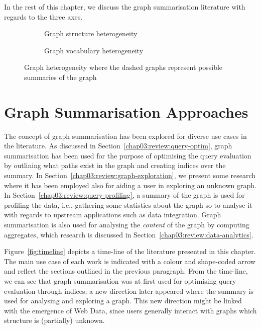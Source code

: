 In the rest of this chapter, we discuss the graph summarisation literature with regards to the three axes.

\begin{figure}
	\centering
	\begin{subfigure}{.5\textwidth}
		\resizebox{\textwidth}{!}{
			
		}
		\caption{Graph structure heterogeneity}
		\label{fig:hetero-struct}
	\end{subfigure}
	\qquad
	\begin{subfigure}{.42\textwidth}
		\resizebox{\textwidth}{!}{
			
		}
		\caption{Graph vocabulary heterogeneity}
		\label{fig:hetero-voc}
	\end{subfigure}
	\caption{Graph heterogeneity where the dashed graphs represent possible summaries of the graph}
	\label{fig:graph-hetero}
\end{figure}

\section{Graph Summarisation Approaches}

The concept of graph summarisation has been explored for diverse use cases in the literature. As discussed in Section~\ref{chap03:review:query-optim}, graph summarisation has been used for the purpose of optimising the query evaluation by outlining what paths exist in the graph and creating indices over the summary. In Section~\ref{chap03:review:graph-exploration}, we present some research where it has been employed also for aiding a user in exploring an unknown graph. In Section~\ref{chap03:review:query-profiling}, a summary of the graph is used for profiling the data, i.e., gathering some statistics about the graph so to analyse it with regards to upstream applications such as data integration. Graph summarisation is also used for analysing the \emph{content} of the graph by computing aggregates, which research is discussed in Section~\ref{chap03:review:data-analytics}.

Figure~\ref{fig:timeline} depicts a time-line of the literature presented in this chapter. The main use case of each work is indicated with a colour and shape-coded arrow and reflect the sections outlined in the previous paragraph. From the time-line, we can see that graph summarisation was at first used for optimising query evaluation through indices; a new direction later appeared where the summary is used for analysing and exploring a graph. This new direction might be linked with the emergence of Web Data, since users generally interact with graphs which structure is (partially) unknown.

